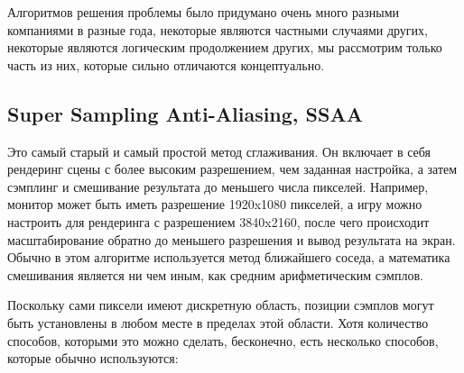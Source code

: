 Алгоритмов решения проблемы было придумано очень много разными компаниями в разные года, некоторые являются частными случаями других, некоторые являются логическим продолжением других, мы рассмотрим только часть из них, которые сильно отличаются концептуально.
\subsection{Super Sampling Anti-Aliasing, SSAA}

Это самый старый и самый простой метод сглаживания. Он включает в себя рендеринг сцены с более высоким разрешением, чем заданная настройка, а затем сэмплинг и смешивание результата до меньшего числа пикселей. Например, монитор может быть иметь разрешение 1920x1080 пикселей, а игру можно настроить для рендеринга с разрешением 3840x2160, после чего происходит масштабирование обратно до меньшего разрешения и вывод результата на экран. Обычно в этом алгоритме используется метод ближайшего соседа, а математика смешивания является ни чем иным, как средним арифметическим сэмплов.

Поскольку сами пиксели имеют дискретную область, позиции сэмплов могут быть установлены в любом месте в пределах этой области. Хотя количество способов, которыми это можно сделать, бесконечно, есть несколько способов, которые обычно используются:

